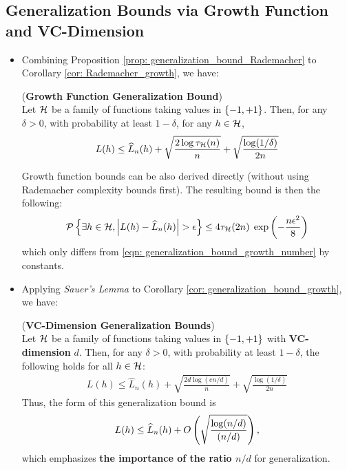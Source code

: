 \documentclass[11pt]{article}
\begin{document}
\subsection{Generalization Bounds via Growth Function and VC-Dimension}
\begin{itemize}
\item Combining Proposition \ref{prop: generalization_bound_Rademacher} to Corollary \ref{cor: Rademacher_growth}, we have:
\begin{corollary} \label{cor: generalization_bound_growth}   (\textbf{Growth Function Generalization Bound})  \citep{mohri2018foundations}\\
Let ${\mathcal H}$ be a family of functions taking values in $\left\{-1, +1\right\}$.  Then, for any $\delta > 0$, with probability at least $1 - \delta$, for any $h \in {\mathcal H}$,
\begin{align}
L(h) \le \widehat{L}_{n}(h) + \sqrt{\frac{2 \log \tau_{{\mathcal H}}(n)}{n}} +\sqrt{\frac{\log(1/\delta)}{2n}} \label{eqn: generalization_bound_growth_number}
\end{align}

Growth function bounds can be also derived directly (without using Rademacher complexity bounds first). The resulting bound is then the following:
\begin{align}
{\mathcal P}\left\{\exists h\in {\mathcal H}, \left\lvert L(h) - \widehat{L}_{n}(h) \right\rvert > \epsilon \right\}  \le 4\tau_{{\mathcal H}}(2n)\;\exp\left(-\frac{n\epsilon^2}{8}\right) \label{eqn: generalization_bound_growth_number_2}
\end{align}
which only differs from \eqref{eqn: generalization_bound_growth_number} by constants.
\end{corollary}

\item Applying \emph{Sauer's Lemma} to Corollary \ref{cor: generalization_bound_growth}, we have:
\begin{corollary} \label{cor: generalization_bound_vc} (\textbf{VC-Dimension Generalization Bounds}) \citep{mohri2018foundations}\\
Let ${\mathcal H}$ be a family of functions taking values in $\left\{-1, +1\right\}$ with \textbf{VC-dimension} $d$. Then, for any $\delta > 0$, with probability at least $1 - \delta$, the following holds for all $h \in {\mathcal H}$:
\begin{align}
L(h) \le \widehat{L}_{n}(h) + \sqrt{\frac{2d \log(en /d)}{n}} +\sqrt{\frac{\log(1/\delta)}{2n}} \label{eqn: generalization_bound_vc_dim}
\end{align}
Thus, the form of this generalization bound is
\begin{align}
L(h) \le \widehat{L}_{n}(h) + O\left(\sqrt{\frac{\log(n /d)}{(n/d)}}\right),  \label{eqn: generalization_bound_vc_dim2}
\end{align}
which emphasizes \textbf{the importance of the ratio $n/d$} for generalization. 
\end{corollary}


\end{itemize}
\end{document}

